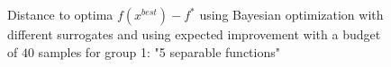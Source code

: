 
\begin{figure}[h]
    \centering
    
    \caption{Distance to optima $f(x^{best})-f^*$ using Bayesian optimization with different surrogates
    and using expected improvement with a budget of $40$ samples for group 1: "5 separable functions"}
\end{figure}

